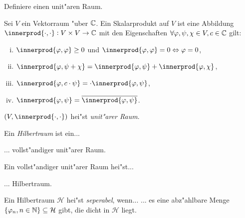 \documentclass[9pt]{article}
\newcommand{\C}[1]{%
	\ifthenelse{\equal{#1}{}}
	{\mathbb{C}}
	{\mathbb{C}^#1}}%
\newcommand{\Hi}{\mathcal{H}}
\DeclarePairedDelimiter{\innerprod}\langle\rangle
\newenvironment{field}{}{\newpage}
\newif\ifnote
\newenvironment{note}{\notetrue}{\notefalse}
\newcommand{\localtag}{}
\newcommand{\globaltag}{}
\newcommand{\uuid}{}
\newcommand{\tags}[1]{
    \ifnote 
        \renewcommand{\localtag}{#1}
    \else
        \renewcommand{\globaltag}{#1}
    \fi 
    }
\newcommand{\xplain}[1]{\renewcommand{\uuid}{#1}}
\begin{document}
\begin{note}
	\xplain{UUID}
	\tags{definition, skalarprodukt, hilbertraum, 5.2}
	
	\begin{field}  %
		Definiere einen unit"aren Raum.
	\end{field}
	
	\begin{field}  %
		Sei $V$ ein Vektorraum "uber $\C{}$. Ein Skalarprodukt auf $V$ ist eine Abbildung $\innerprod{\cdot, \cdot}: V \times V \rightarrow \C{}$ mit den Eigenschaften 
		$\forall \varphi, \psi, \chi \in V, c \in \C{}$ gilt:
		\begin{enumerate}[i)]
			\item $\innerprod{\varphi,\varphi} \geq 0$ und $\innerprod{\varphi,\varphi} = 0 \Leftrightarrow \varphi = 0$,
			\item $\innerprod{\varphi, \psi + \chi} = \innerprod{\varphi,\psi} + \innerprod{\varphi,\chi}$,
			\item $\innerprod{\varphi, c \cdot \psi}= \cdot \innerprod{\varphi, \psi}$,
			\item $\innerprod{\varphi, \psi} = \overline{\innerprod{\varphi,\psi}}$.
		\end{enumerate}
	
	$(V, \innerprod{\cdot, \cdot})$ hei"st \textit{unit"arer Raum}.
	\end{field}

	\begin{field}  %
		Ein \textit{Hilbertraum} ist ein...
	\end{field}
	
	\begin{field}  %
		... vollst"andiger unit"arer Raum.
	\end{field}
	
	\begin{field}  %
		Ein vollst"andiger unit"arer Raum hei"st...
	\end{field}
	
	\begin{field}  %
		... Hilbertraum. 
	\end{field}
		
	\begin{field}  %
		Ein Hilbertraum $\Hi$ hei"st \textit{seperabel}, wenn...
	\end{field}
	\begin{field}  %
		... es eine abz"ahlbare Menge
		$\qty{\varphi_n, n\in \mathbb{N}} \subseteq \Hi$ gibt, die dicht in $\Hi$ liegt.

	\end{field}
\end{note}
\end{document}
